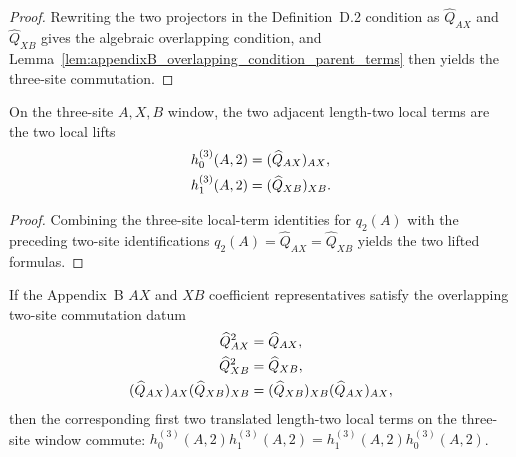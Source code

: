 \begin{proof}
    \leanok
    Rewriting the two projectors in the Definition~D.2 condition as
    $\widehat Q_{AX}$ and $\widehat Q_{XB}$ gives the algebraic overlapping
    condition, and Lemma~\ref{lem:appendixB_overlapping_condition_parent_terms}
    then yields the three-site commutation.
\end{proof}

\begin{lemma}
    \label{lem:appendixB_three_site_parent_lifts}
    \leanok
    On the three-site $A,X,B$ window, the two adjacent length-two local terms
    are the two local lifts
    \begin{align}
        h_0^{(3)}(A,2)
         & =(\widehat Q_{AX})_{AX},
        \notag                      \\
        h_1^{(3)}(A,2)
         & =(\widehat Q_{XB})_{XB}.
        \notag
    \end{align}
\end{lemma}

\begin{proof}
    \leanok
    Combining the three-site local-term identities for $q_2(A)$ with the
    preceding two-site identifications $q_2(A)=\widehat Q_{AX}=\widehat Q_{XB}$
    yields the two lifted formulas.
\end{proof}

\begin{lemma}
    \label{lem:appendixB_overlapping_condition_parent_terms}
    \leanok
    If the Appendix~B $AX$ and $XB$ coefficient representatives satisfy the
    overlapping two-site commutation datum
    \begin{align}
        \widehat Q_{AX}^2
         & =\widehat Q_{AX},
        \notag               \\
        \widehat Q_{XB}^2
         & =\widehat Q_{XB},
        \notag               \\
        (\widehat Q_{AX})_{AX}(\widehat Q_{XB})_{XB}
         & =
        (\widehat Q_{XB})_{XB}(\widehat Q_{AX})_{AX},
        \notag
    \end{align}
    then the corresponding first two translated length-two local terms on the
    three-site window commute:
    $h_0^{(3)}(A,2)h_1^{(3)}(A,2) = h_1^{(3)}(A,2)h_0^{(3)}(A,2)$.
\end{lemma}

